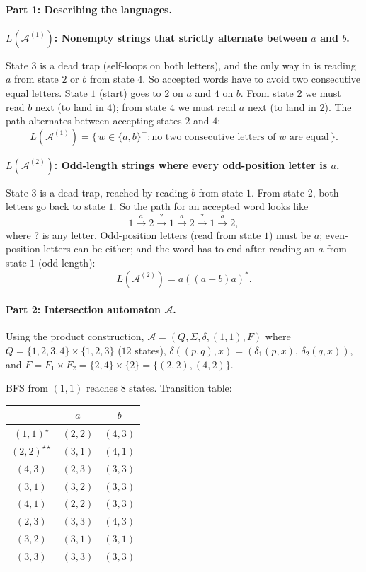 \documentclass{article}
\theoremstyle{theorem}
\theoremstyle{definition}
\theoremstyle{remark}
\begin{document}
\paragraph{Part 1: Describing the languages.}

\textbf{$L(\mathcal{A}^{(1)})$: Nonempty strings that strictly alternate between $a$ and $b$.}

State $3$ is a dead trap (self-loops on both letters), and the only way in is reading $a$ from state $2$ or $b$ from state $4$. So accepted words have to avoid two consecutive equal letters. State $1$ (start) goes to $2$ on $a$ and $4$ on $b$. From state $2$ we must read $b$ next (to land in $4$); from state $4$ we must read $a$ next (to land in $2$). The path alternates between accepting states $2$ and $4$:
\[
  L(\mathcal{A}^{(1)}) = \{\, w \in \{a, b\}^+ : \text{no two consecutive letters of } w \text{ are equal}\,\}.
\]

\textbf{$L(\mathcal{A}^{(2)})$: Odd-length strings where every odd-position letter is $a$.}

State $3$ is a dead trap, reached by reading $b$ from state $1$. From state $2$, both letters go back to state $1$. So the path for an accepted word looks like
\[
  1 \xrightarrow{a} 2 \xrightarrow{?} 1 \xrightarrow{a} 2 \xrightarrow{?} 1 \xrightarrow{a} 2,
\]
where $?$ is any letter. Odd-position letters (read from state $1$) must be $a$; even-position letters can be either; and the word has to end after reading an $a$ from state $1$ (odd length):
\[
  L(\mathcal{A}^{(2)}) = a((a+b)a)^*.
\]

\paragraph{Part 2: Intersection automaton $\mathcal{A}$.}

Using the product construction, $\mathcal{A} = (Q, \Sigma, \delta, (1,1), F)$ where $Q = \{1,2,3,4\} \times \{1,2,3\}$ ($12$ states), $\delta((p, q), x) = (\delta_1(p, x),\, \delta_2(q, x))$, and $F = F_1 \times F_2 = \{2, 4\} \times \{2\} = \{(2,2), (4,2)\}$.

BFS from $(1, 1)$ reaches $8$ states. Transition table:

\begin{center}
\begin{tabular}{c|cc}
 & $a$ & $b$ \\ \hline
$(1, 1)^{\star}$        & $(2, 2)$ & $(4, 3)$ \\
$(2, 2)^{\star\star}$   & $(3, 1)$ & $(4, 1)$ \\
$(4, 3)$                & $(2, 3)$ & $(3, 3)$ \\
$(3, 1)$                & $(3, 2)$ & $(3, 3)$ \\
$(4, 1)$                & $(2, 2)$ & $(3, 3)$ \\
$(2, 3)$                & $(3, 3)$ & $(4, 3)$ \\
$(3, 2)$                & $(3, 1)$ & $(3, 1)$ \\
$(3, 3)$                & $(3, 3)$ & $(3, 3)$ \\
\end{tabular}
\end{center}
\end{document}
